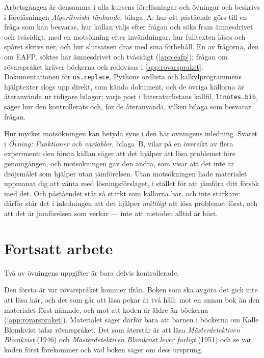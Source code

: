 Arbetsgången är densamma i alla kursens föreläsningar och övningar och
beskrivs i föreläsningen \emph{Algoritmiskt tänkande}, bilaga~A: hur ett
påstående görs till en fråga som kan besvaras, hur källan väljs efter
frågan och söks fram ämnesdrivet och tvåsidigt, med en motsökning efter
invändningar, hur fulltexten läses och spåret skrivs ner, och hur
slutsatsen dras med sina förbehåll.  En av frågorna, den om EAFP,
söktes här ämnesdrivet och tvåsidigt (\cref{app:eafp}); frågan om
rövarspråket kräver böckerna och redovisas i \cref{app:rovarspraket}.
Dokumentationen för \texttt{os.replace}, Pythons ordlista
och kalkylprogrammens hjälptexter slogs upp direkt, som kända dokument,
och de övriga källorna är återanvända ur tidigare bilagor; varje post i
litteraturlistans källfil, \texttt{ltnotes.bib}, säger hur den
kontrollerats och, för de återanvända, vilken bilaga som besvarar
frågan.

Hur mycket motsökningen kan betyda syns i den här övningens inledning.
Svaret i \emph{Övning: Funktioner och variabler}, bilaga~B, vilar på en
översikt av flera experiment: den första källan säger att det hjälper
att lösa problemet före genomgången, och motsökningen gav den andra, som
visar att det inte är dröjsmålet som hjälper utan jämförelsen.  Utan
motsökningen hade materialet uppmanat dig att vänta med
lösningsförslaget, i stället för att jämföra ditt försök med det.  Och
påståendet står så starkt som källorna bär, och inte starkare: därför
står det i inledningen att det hjälper \emph{måttligt} att lösa
problemet först, och att det är jämförelsen som verkar --- inte att
metoden alltid är bäst.

\section{Fortsatt arbete}
\label{sec:ovning-files-fortsatt}

Två av övningens uppgifter är bara delvis kontrollerade.

Den första är var rövarspråket kommer ifrån.  Boken som ska avgöra det
gick inte att läsa här, och det som går att läsa pekar åt två håll: mot
en annan bok än den materialet först nämnde, och mot att koden är äldre
än böckerna (\cref{app:rovarspraket}).  Materialet säger därför bara
att barnen i böckerna om Kalle Blomkvist talar rövarspråket.  Det som
återstår är att läsa \emph{Mästerdetektiven Blomkvist} (1946) och
\emph{Mästerdetektiven Blomkvist lever farligt} (1951) och se var koden
först förekommer och vad boken säger om dess ursprung.

